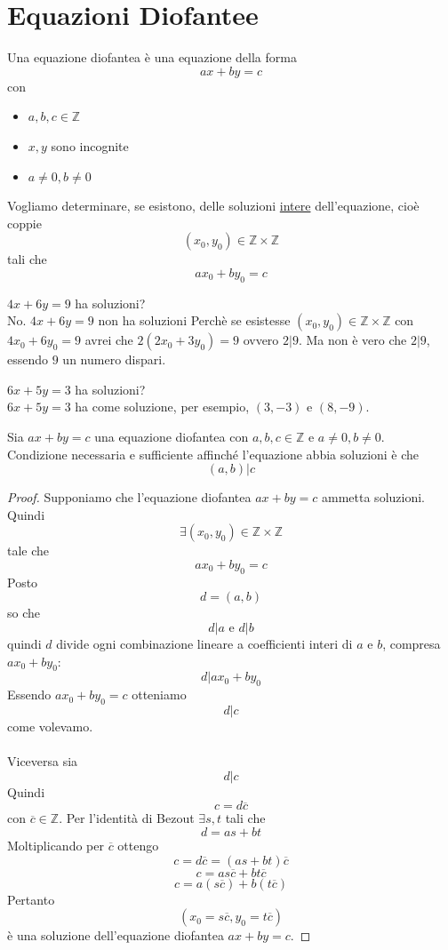 \documentclass[a4paper,12pt, oneside]{book}
\begin{document}
\chapter{Equazioni Diofantee}
	\begin{definizione}
		Una equazione diofantea è una equazione della forma $$ax+by=c$$ con
		\begin{itemize}
			\item $a,b,c \in \mathbb{Z}$
			\item $x,y$ sono incognite
			\item $a \not = 0, b \not = 0$
		\end{itemize}
		Vogliamo determinare, se esistono, delle soluzioni \underline{intere} dell'equazione, cioè coppie $$(x_0, y_0) \in \mathbb{Z} \times \mathbb{Z} $$ tali che $$ax_0+by_0=c$$
	\end{definizione}
	\begin{shaded}
		\begin{esempio}
			$4x+6y=9$ ha soluzioni?\\
			No. $4x+6y=9$ non ha soluzioni Perchè se esistesse $(x_0,y_0) \in \mathbb{Z} \times \mathbb{Z}$ con $4x_0+6y_0=9$ avrei che $2(2x_0+3y_0)=9$ ovvero $2|9$. Ma non è vero che $2|9$, essendo $9$ un numero dispari.
		\end{esempio}
		\begin{esempio}
			$6x+5y=3$ ha soluzioni?\\
			$6x+5y=3$ ha come soluzione, per esempio, $(3,-3)$ e $(8,-9)$.
		\end{esempio}
	\end{shaded}
	\begin{teorema}
		Sia $ax+by=c$ una equazione diofantea con $a,b,c \in \mathbb{Z}$ e $a\not=0,b\not=0$.\\
		Condizione necessaria e sufficiente affinché l'equazione abbia soluzioni è che $$(a,b)|c$$
		
		\begin{proof}
			Supponiamo che l'equazione diofantea $ax+by=c$ ammetta soluzioni. Quindi $$\exists (x_0,y_0) \in \mathbb{Z} \times \mathbb{Z}$$ tale che $$ax_0+by_0=c$$
			Posto $$d=(a,b)$$ so che $$d|a \mbox{ e } d|b$$ quindi $d$ divide ogni combinazione lineare a coefficienti interi di $a$ e $b$, compresa $ax_0+by_0$:
			$$d|ax_0+by_0$$
			Essendo $ax_0+by_0 = c$ otteniamo $$d|c$$ come volevamo.\\\\
			
			Viceversa sia $$d|c$$
			Quindi $$c=d\overline{c}$$ con $\overline{c} \in \mathbb{Z}$. 
			Per l'identità di Bezout $\exists s,t$ tali che $$d=as+bt$$
			Moltiplicando per $\overline{c}$ ottengo
			$$c = d\overline{c} = (as+bt)\overline{c}$$
			$$c = as\overline{c}+bt\overline{c}$$
			$$c = a(s\overline{c})+b(t\overline{c})$$
			Pertanto $$(x_0 = s\overline{c}, y_0 = t\overline{c})$$ è una soluzione dell'equazione diofantea $ax+by=c$.
		\end{proof}
	\end{teorema}
\end{document}
